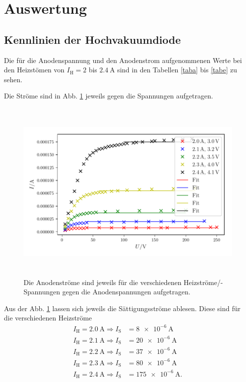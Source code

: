 \section{Auswertung}
\label{sec:Auswertung}

\subsection{Kennlinien der Hochvakuumdiode}
\label{sec:a}
Die für die Anodenspannung und den Anodenstrom aufgenommenen Werte
bei den Heizstömen von $I_\text{H} = \num{2}$ bis $\SI{2.4}{\ampere}$
sind in den Tabellen \ref{taba} bis \ref{tabe} zu sehen.







\noindent Die Ströme sind in Abb. \ref{fig:plot1} jeweils gegen die Spannungen
aufgetragen.
\begin{figure}
    \centering
    \includegraphics[width=15cm, height=9cm]{build/plot1.pdf}
    \caption{Die Anodenströme sind jeweils für die verschiedenen Heizströme/-Spannungen
    gegen die Anodenspannungen aufgetragen.}
    \label{fig:plot1}
\end{figure}

\noindent Aus der Abb. \ref{fig:plot1} lassen sich jeweils
die Sättigungsströme ablesen. Diese sind für die verschiedenen
Heizströme
\begin{align*}
    I_\text{H} = \SI{2.0}{\ampere} \Rightarrow I_\text{S} &= \SI{8e-6}{\ampere} \\
    I_\text{H} = \SI{2.1}{\ampere} \Rightarrow I_\text{S} &= \SI{20e-6}{\ampere} \\
    I_\text{H} = \SI{2.2}{\ampere} \Rightarrow I_\text{S} &= \SI{37e-6}{\ampere} \\
    I_\text{H} = \SI{2.3}{\ampere} \Rightarrow I_\text{S} &= \SI{80e-6}{\ampere} \\
    I_\text{H} = \SI{2.4}{\ampere} \Rightarrow I_\text{S} &= \SI{175e-6}{\ampere}.
\end{align*}


